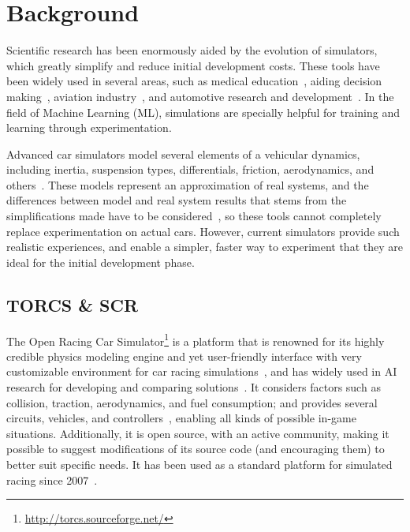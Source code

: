 \section{Background}\label{sec:2}
Scientific research has been enormously aided by the evolution of simulators, which greatly simplify and reduce initial development costs. These tools have been widely used in several areas, such as medical education~\cite{MEDIC}, aiding decision making~\cite{useOfSimulaton2002}, aviation industry~\cite{AIR}, and automotive research and development~\cite{AUTR}. In the field of Machine Learning (ML), simulations are specially helpful for training and learning through experimentation.

Advanced car simulators model several elements of a vehicular dynamics, including inertia, suspension types, differentials, friction, aerodynamics, and others~\cite{TORCS}. These models represent an approximation of real systems, and the differences between model and real system results that stems from the simplifications made have to be considered~\cite{brookes2012authentic}, so these tools cannot completely replace experimentation on actual cars. However, current simulators provide such realistic experiences, and enable a simpler, faster way to experiment that they are ideal for the initial development phase.






\subsection{TORCS \& SCR}
The Open Racing Car Simulator\footnote{\url{http://torcs.sourceforge.net/}} is a platform that is renowned for its highly credible physics modeling engine and yet user-friendly interface with very customizable environment for car racing simulations~\cite{SCR,TORCS}, and has widely used in AI research for developing and comparing solutions~\cite{2009}. It considers factors such as collision, traction, aerodynamics, and fuel consumption; and provides several circuits, vehicles, and controllers~\cite{2009,Loiacono:2012:LEA:2212908.2212953}, enabling all kinds of possible in-game situations. Additionally, it is open source, with an active community, making it possible to suggest modifications of its source code (and encouraging them) to better suit specific needs. It has been used as a standard platform for simulated racing since 2007~\cite{Loiacono:2012:LEA:2212908.2212953}.

